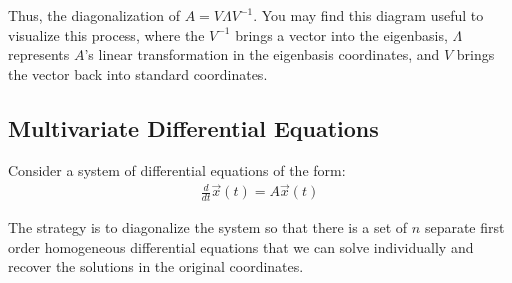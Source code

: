 Thus, the diagonalization of $\boxed{A = V \Lambda V^{-1}}$. You may find this diagram useful to visualize this process, where the $V^{-1}$ brings a vector into the eigenbasis, $\Lambda$ represents $A$'s linear transformation in the eigenbasis coordinates, and $V$ brings the vector back into standard coordinates.
\begin{figure}[H]
    \centering
\end{figure}

\subsection*{Multivariate Differential Equations}
Consider a system of differential equations of the form:
\begin{align*}
    \frac{d}{dt} \vec{x}(t) = A \vec{x}(t)
\end{align*}

The strategy is to diagonalize the system so that there is a set of $n$ separate first order homogeneous differential equations that we can solve individually and recover the solutions in the original coordinates.

